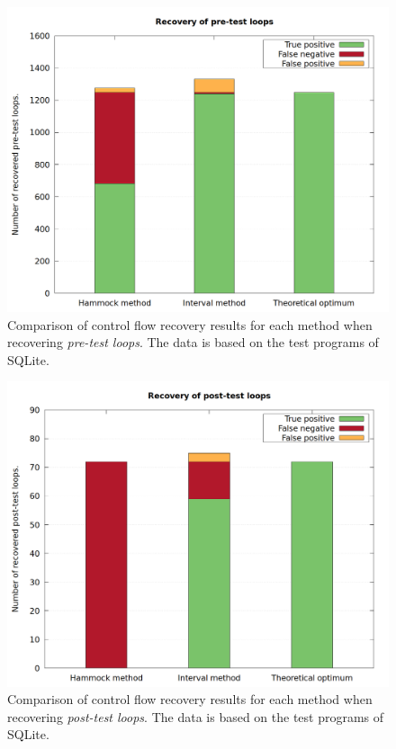 \begin{figure}[htbp]
	\centering
	\includegraphics[width=\textwidth]{inc/appendices/test_program_results/sqlite/results_pre_loop.png}
	\caption{Comparison of control flow recovery results for each method when recovering \textit{pre-test loops}. The data is based on the test programs of SQLite.}
	\label{fig:sqlite_results_pre_loop}
\end{figure}

\begin{figure}[htbp]
	\centering
	\includegraphics[width=\textwidth]{inc/appendices/test_program_results/sqlite/results_post_loop.png}
	\caption{Comparison of control flow recovery results for each method when recovering \textit{post-test loops}. The data is based on the test programs of SQLite.}
	\label{fig:sqlite_results_post_loop}
\end{figure}
